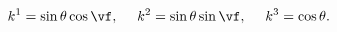 \begin{equation}                                        \label{epacsn}
  k^1=\sin\theta\cos\vf,~~~~k^2=\sin\theta\sin\vf,~~~~k^3=\cos\theta.
\end{equation}

